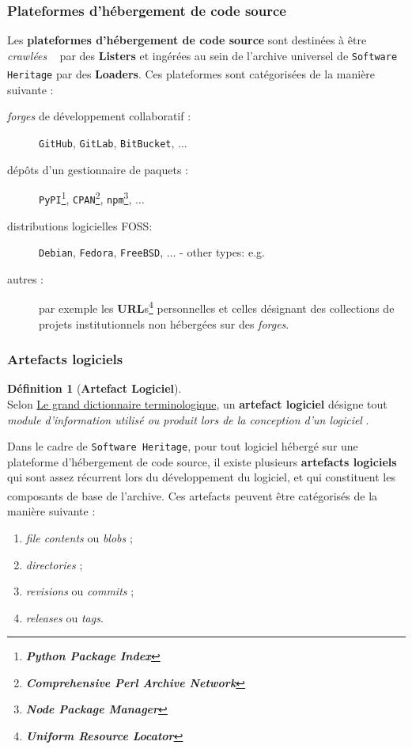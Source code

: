 \documentclass[12pt,a4paper]{report}
\theoremstyle{definition}
\newtheorem*{definition}{Définition}
\begin{document}
\subsubsection{Plateformes d'hébergement de code source}
Les \textbf{plateformes d'hébergement de code source} sont destinées à être \og \textit{crawlées} \fg~ par des \textbf{Listers} et ingérées au sein de l'archive universel de \texttt{Software Heritage} par des \textbf{Loaders}\textsuperscript{\citep{dicosmoWhyAndHow}}. Ces plateformes sont catégorisées de la manière suivante :
\begin{description}
	\item [\textit{forges} de développement collaboratif :] \texttt{GitHub}, \texttt{GitLab}, \texttt{BitBucket}, $\dots$
	\item [dépôts d'un gestionnaire de paquets :] \texttt{PyPI}\footnote{\textbf{\textit{Python Package Index}}}, \texttt{CPAN}\footnote{\textbf{\textit{Comprehensive Perl Archive Network}}}, \texttt{npm}\footnote{\textbf{\textit{Node Package Manager}}}, $\dots$
	\item [distributions logicielles FOSS\footnotemark :] \texttt{Debian}, \texttt{Fedora}, \texttt{FreeBSD}, $\dots$
	- other types: e.g.
	\item [autres :] par exemple les \textbf{URL}s\footnote{\textbf{\textit{Uniform Resource Locator}}} personnelles et celles désignant des collections de projets institutionnels non hébergées sur des \textit{forges}.
\end{description}

\subsubsection{Artefacts logiciels}
\begin{definition}[\textbf{Artefact Logiciel}]\mbox{}\\
Selon \href{http://www.granddictionnaire.com/ficheOqlf.aspx?Id_Fiche=8367467}{Le grand dictionnaire terminologique}, un \textbf{artefact logiciel} désigne tout \og \textit{module d'information utilisé ou produit lors de la conception d'un logiciel} \fg.
\end{definition}

Dans le cadre de \texttt{Software Heritage}, pour tout logiciel hébergé sur une plateforme d'hébergement de code source, il existe plusieurs \textbf{artefacts logiciels} qui sont assez récurrent lors du développement du logiciel, et qui constituent les composants de base de l'archive\textsuperscript{\citep{dicosmoWhyAndHow}}. Ces artefacts peuvent être catégorisés de la manière suivante :
\begin{enumerate}
	\item \textit{file contents} ou \textit{blobs} ;
	\item \textit{directories} ;
	\item \textit{revisions} ou \textit{commits} ;
	\item \textit{releases} ou \textit{tags}.
\end{enumerate}
\end{document}
